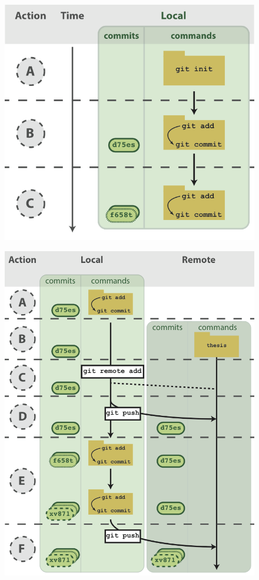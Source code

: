 \documentclass[10pt]{article}
\begin{document}
\begin{figure}[h!]
\begin{center}
\includegraphics[width=0.7\columnwidth]{figures/Fig2/Fig2}
\caption{\textbf{\label{fig:Fig2}}%
}
\end{center}
\end{figure}

\begin{figure}[h!]
\begin{center}
\includegraphics[width=0.7\columnwidth]{figures/Fig3/Fig3}
\caption{\textbf{\label{fig:Fig3}}%
}
\end{center}
\end{figure}
\end{document}
